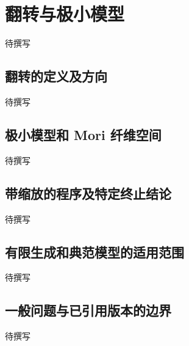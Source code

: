 
% 
% 
% 

\section{翻转与极小模型}
\label{g5:sec:3004}

待撰写

\subsection{翻转的定义及方向}
\label{g5:subsec:3004:01}
待撰写

\subsection{极小模型和 Mori 纤维空间}
\label{g5:subsec:3004:02}
待撰写

\subsection{带缩放的程序及特定终止结论}
\label{g5:subsec:3004:03}
待撰写

\subsection{有限生成和典范模型的适用范围}
\label{g5:subsec:3004:04}
待撰写

\subsection{一般问题与已引用版本的边界}
\label{g5:subsec:3004:05}
待撰写
